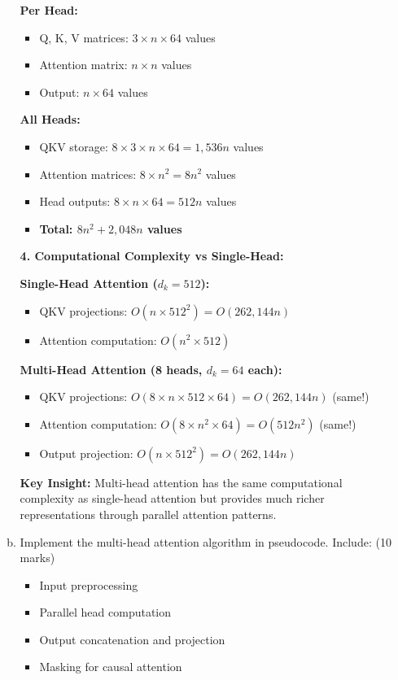\documentclass[12pt]{article}
\begin{document}
\begin{center}
\begin{enumerate}[(a)]
\begin{enumerate}[(a)]
{    \textbf{Per Head:}
    \begin{itemize}
        \item Q, K, V matrices: $3 \times n \times 64$ values
        \item Attention matrix: $n \times n$ values
        \item Output: $n \times 64$ values
    \end{itemize}
    
    \textbf{All Heads:}
    \begin{itemize}
        \item QKV storage: $8 \times 3 \times n \times 64 = 1,536n$ values
        \item Attention matrices: $8 \times n^2 = 8n^2$ values
        \item Head outputs: $8 \times n \times 64 = 512n$ values
        \item \textbf{Total: $8n^2 + 2,048n$ values}
    \end{itemize}
    
    \textbf{4. Computational Complexity vs Single-Head:}
    
    \textbf{Single-Head Attention ($d_k = 512$):}
    \begin{itemize}
        \item QKV projections: $O(n \times 512^2) = O(262,144n)$
        \item Attention computation: $O(n^2 \times 512)$
    \end{itemize}
    
    \textbf{Multi-Head Attention (8 heads, $d_k = 64$ each):}
    \begin{itemize}
        \item QKV projections: $O(8 \times n \times 512 \times 64) = O(262,144n)$ (same!)
        \item Attention computation: $O(8 \times n^2 \times 64) = O(512n^2)$ (same!)
        \item Output projection: $O(n \times 512^2) = O(262,144n)$
    \end{itemize}
    
    \textbf{Key Insight:} Multi-head attention has the same computational complexity as single-head attention but provides much richer representations through parallel attention patterns.
    }
    
    \item Implement the multi-head attention algorithm in pseudocode. Include: \hfill (10 marks)
    \begin{itemize}
        \item Input preprocessing
        \item Parallel head computation
        \item Output concatenation and projection
        \item Masking for causal attention
    \end{itemize}
    

\end{enumerate}
\end{enumerate}
\end{center}
\end{document}
